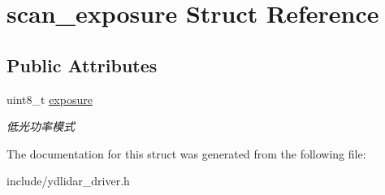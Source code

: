\hypertarget{structscan__exposure}{}\section{scan\+\_\+exposure Struct Reference}
\label{structscan__exposure}
\subsection*{Public Attributes}
\begin{DoxyCompactItemize}
\item 
uint8\+\_\+t \hyperlink{structscan__exposure_a49591ef660667fcd1c3e1c2f3d764004}{exposure}\hypertarget{structscan__exposure_a49591ef660667fcd1c3e1c2f3d764004}{}\label{structscan__exposure_a49591ef660667fcd1c3e1c2f3d764004}

\begin{DoxyCompactList}\small\item\em 低光功率模式 \end{DoxyCompactList}\end{DoxyCompactItemize}


The documentation for this struct was generated from the following file\+:\begin{DoxyCompactItemize}
\item 
include/ydlidar\+\_\+driver.\+h\end{DoxyCompactItemize}
